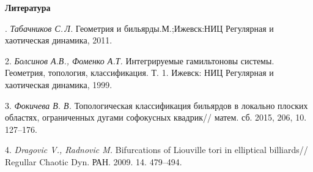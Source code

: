 \smallskip \centerline {\bf Литература} . {\it Табачников С.\,Л.}
Геометрия и бильярды.М.;Ижевск:НИЦ Регулярная и хаотическая динамика, 2011.

2. {\it Болсинов А.В., Фоменко А.Т.}
Интегрируемые гамиль\-тоновы системы. Геометрия, топология, классификация. Т. 1. Ижевск: НИЦ Регулярная и хаотическая динамика, 1999.

3. {\it Фокичева В. В.}
Топологическая классификация бильярдов в локально плоских областях, ограниченных дугами софокусных квадрик//
матем. сб. 2015, 206, 10. 127--176.

4. {\it Dragovic V., Radnovic M.}
Bifurcations of Liouville tori in elliptical billiards//
Regullar Chaotic Dyn. РАН. 2009. 14. 479--494.
